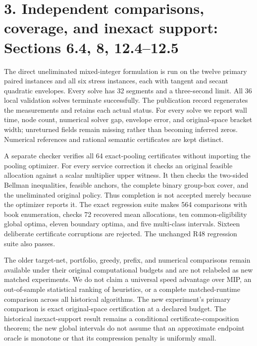 \documentclass[11pt,letterpaper]{article}
\begin{document}
\section*{3. Independent comparisons, coverage, and inexact support: Sections 6.4, 8, 12.4–12.5}


The direct uneliminated mixed-integer formulation is run on the twelve primary paired instances and all six stress instances, each with tangent and secant quadratic envelopes. Every solve has 32 segments and a three-second limit. All 36 local validation solves terminate successfully. The publication record regenerates the measurements and retains each actual status. For every solve we report wall time, node count, numerical solver gap, envelope error, and original-space bracket width; unreturned fields remain missing rather than becoming inferred zeros. Numerical references and rational semantic certificates are kept distinct.



A separate checker verifies all 64 exact-pooling certificates without importing the pooling optimizer. For every service correction it checks an original feasible allocation against a scalar multiplier upper witness. It then checks the two-sided Bellman inequalities, feasible anchors, the complete binary group-box cover, and the uneliminated original policy. Thus completion is not accepted merely because the optimizer reports it. The exact regression suite makes 564 comparisons with book enumeration, checks 72 recovered mean allocations, ten common-eligibility global optima, eleven boundary optima, and five multi-class intervals. Sixteen deliberate certificate corruptions are rejected. The unchanged R48 regression suite also passes.



The older target-net, portfolio, greedy, prefix, and numerical comparisons remain available under their original computational budgets and are not relabeled as new matched experiments. We do not claim a universal speed advantage over MIP, an out-of-sample statistical ranking of heuristics, or a complete matched-runtime comparison across all historical algorithms. The new experiment's primary comparison is exact original-space certification at a declared budget. The historical inexact-support result remains a conditional certificate-composition theorem; the new global intervals do not assume that an approximate endpoint oracle is monotone or that its compression penalty is uniformly small.
\end{document}
